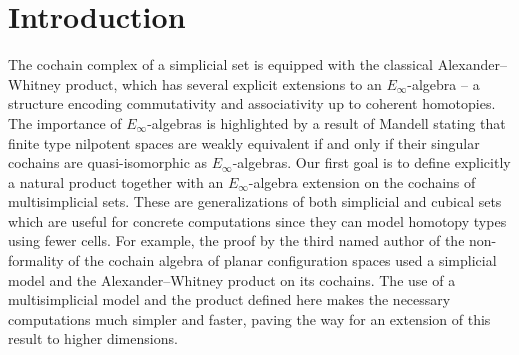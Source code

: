 
\section{Introduction}\label{s:introduction}

The cochain complex of a simplicial set is equipped with the classical Alexander--Whitney product, which has several explicit extensions to an $E_\infty$-algebra \cite{mcclure2003multivariable, berger2004combinatorial, medina2020prop1} -- a structure encoding commutativity and associativity up to coherent homotopies.
The importance of $E_\infty$-algebras is highlighted by a result of Mandell \cite{mandell2006homotopy_type} stating that finite type nilpotent spaces are weakly equivalent if and only if their singular cochains are quasi-isomorphic as $E_\infty$-algebras.
Our first goal is to define explicitly a natural product together with an $E_\infty$-algebra extension on the cochains of multisimplicial sets.
These are generalizations of both simplicial and cubical sets which are useful for concrete computations since they can model homotopy types using fewer cells.
For example, the proof by the third named author of the non-formality of the cochain algebra of planar configuration spaces \cite{salvatore2020planarnonformality} used a simplicial model and the Alexander--Whitney product on its cochains.
The use of a multisimplicial model and the product defined here makes the necessary computations much simpler and faster, paving the way for an extension of this result to higher dimensions.

